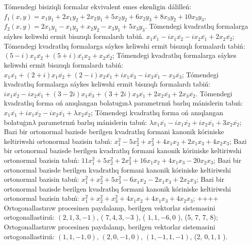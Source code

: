 Tómendegi bisiziqli formalar ekvivalent emes ekenligin dálilleń:\(f_{1}(x,y) = x_{1}y_{1} + 2x_{1}y_{2} + 2x_{2}y_{1} + 5x_{2}y_{2} + 6x_{2}y_{3} + 8x_{3}y_{2} + 10x_{3}y_{3}\), \(f_{2}(x,y) = 2x_{1}y_{1} - x_{1}y_{3} + x_{2}y_{2} - x_{3}y_{1} + 5x_{3}y_{3}\).
Tómendegi kvadratlıq formalarga sáykes keliwshi ermit bisızıqlı formalardı tabiń. \(x_{1}\overline{x_{1}} - ix_{1}\overline{x_{2}} - ix_{2}\overline{x_{1}} + 2x_{2}\overline{x_{2}}\);
Tómendegi kvadratlıq formalarga sáykes keliwshi ermit bisızıqlı formalardı tabiń:\((5 - i)x_{1}\overline{x_{2}} + (5 + i)\overline{x_{1}}x_{2} + x_{2}\overline{x_{2}}\);
Tómendegi kvadratlıq formalarga sáykes keliwshi ermit bisızıqlı formalardı tabiń: \(x_{1}\overline{x_{1}} + (2 + i)x_{1}\overline{x_{2}} + (2 - i)x_{2}\overline{x_{1}} + ix_{1}\overline{x_{3}} - ix_{3}\overline{x_{1}} - x_{3}\overline{x_{3}}\);
Tómendegi kvadratlıq formalarga sáykes keliwshi ermit bisızıqlı formalardı tabiń: \(ix_{1}\overline{x_{2}} - ix_{2}\overline{x_{1}} + (3 - 2i)x_{1}\overline{x_{3}} + (3 + 2i)x_{3}\overline{x_{1}} + 2x_{2}\overline{x_{3}} + 2x_{3}\overline{x_{2}}\).
Tómendegi kvadratlıq forma oń anıqlangan bolatuģın\(\lambda\) parametrnıń barlıq mánislerin tabıń: \(x_{1}\overline{x_{1}} + ix_{1}\overline{x_{2}} - ix_{2}\overline{x_{1}} + \lambda x_{2}\overline{x_{2}}\);
Tómendegi kvadratlıq forma oń anıqlangan bolatuģın\(\lambda\) parametrnıń barlıq mánislerin tabıń: \(\lambda x_{1}\overline{x_{1}} - ix_{1}\overline{x_{2}} + ix_{2}\overline{x_{1}} + 3x_{2}\overline{x_{2}}\);
Bazi bir ortonormal bazisde berilgen kvadratlıq formani kanonik kóriniske keltiriwshi ortonormal bazisin tabıń: \(x_{1}^{2} - 5x_{2}^{2} + x_{3}^{2} + 4x_{1}x_{2} + 2x_{1}x_{3} + 4x_{2}x_{3}\);
Bazi bir ortonormal bazisde berilgen kvadratlıq formani kanonik kóriniske keltiriwshi ortonormal bazisin tabıń: \(11x_{1}^{2} + 5x_{2}^{2} + 2x_{3}^{2} + 16x_{1}x_{2} + 4x_{1}x_{3} - 20x_{2}x_{3}\);
Bazi bir ortonormal bazisde berilgen kvadratlıq formani kanonik kóriniske keltiriwshi ortonormal bazisin tabıń: \(x_{1}^{2} + x_{2}^{2} + 5x_{3}^{2} - 6x_{1}x_{2} - 2x_{1}x_{3} + 2x_{2}x_{3}\);
Bazi bir ortonormal bazisde berilgen kvadratlıq formani kanonik kóriniske keltiriwshi ortonormal bazisin tabıń: \(x_{1}^{2} + x_{2}^{2} + x_{3}^{2} + 4x_{1}x_{2} + 4x_{1}x_{3} + 4x_{2}x_{3}\);
++++
Ortogonallastırıw procesinen paydalanıp, berilgen vektorlar sistemasini ortogonallastirıń: \((2,1,3, - 1)\), ( \(7,4,3, - 3\) ), ( \(1,1, - 6,0\) ), (5, 7, 7, 8);
Ortogonallastırıw procesinen paydalanıp, berilgen vektorlar sistemasini ortogonallastirıń: \((1,1, - 1,0)\), \((2,0, - 1,0)\), \((1, - 1,1, - 1)\), (2, \(0,1,1\) ).
